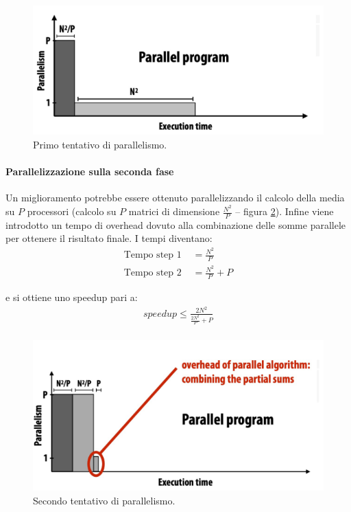\begin{figure}[th]
	\centering
	\includegraphics[width=0.7\linewidth]{img/esecuzione-parallela-1.png}
	\caption{Primo tentativo di parallelismo.}
	\label{fig:esecuzione-parallela-1}
\end{figure}

\paragraph{Parallelizzazione sulla seconda fase}Un miglioramento potrebbe essere ottenuto parallelizzando il calcolo della media su ${P}$ processori (calcolo su $P$ matrici di dimensione $\frac{ N^2}{P}$ -- figura \ref{fig:esecuzione-parallela-2}). Infine viene introdotto un tempo di overhead dovuto alla combinazione delle somme parallele per ottenere il risultato finale. I tempi diventano:
\begin{align*}
    \text{Tempo step 1 } &= \frac{N^2}{P}\\
    \text{Tempo step 2 } &= \frac{N^2}{P}+P    
\end{align*}

e si ottiene uno speedup pari a:
\begin{align*}
    speedup \le \frac{2N^2}{\frac{2N^2}{P} + P}\\
\end{align*}

\begin{figure}[th]
	\centering
	\includegraphics[width=0.7\linewidth]{img/esecuzione-parallela-2.png}
	\caption{Secondo tentativo di parallelismo.}
	\label{fig:esecuzione-parallela-2}
\end{figure}

